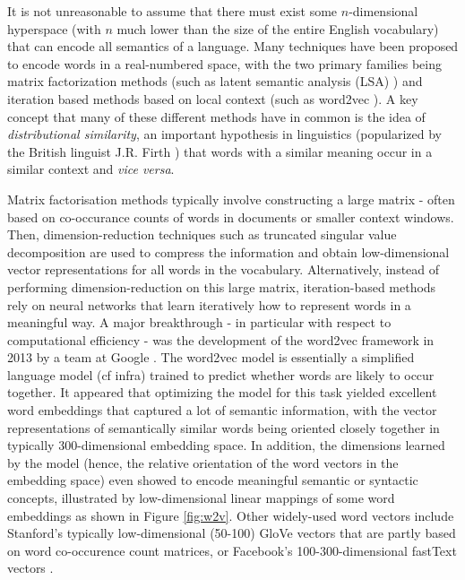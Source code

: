 \documentclass[12pt,a4paper,]{book}
\begin{document}
It is not unreasonable to assume that there must exist some \(n\)-dimensional hyperspace (with \(n\) much lower than the size of the entire English vocabulary) that can encode all semantics of a language. Many techniques have been proposed to encode words in a real-numbered space, with the two primary families being matrix factorization methods (such as latent semantic analysis (LSA) \citep{deerwester1990}) and iteration based methods based on local context (such as word2vec \citep{mikolov2013}). A key concept that many of these different methods have in common is the idea of \emph{distributional similarity}, an important hypothesis in linguistics (popularized by the British linguist J.R. Firth \citep{firth1957}) that words with a similar meaning occur in a similar context and \emph{vice versa}.

Matrix factorisation methods typically involve constructing a large matrix - often based on co-occurance counts of words in documents or smaller context windows. Then, dimension-reduction techniques such as truncated singular value decomposition are used to compress the information and obtain low-dimensional vector representations for all words in the vocabulary. Alternatively, instead of performing dimension-reduction on this large matrix, iteration-based methods rely on neural networks that learn iteratively how to represent words in a meaningful way. A major breakthrough - in particular with respect to computational efficiency - was the development of the word2vec framework in 2013 by a team at Google \citep{mikolov2013}. The word2vec model is essentially a simplified language model (cf infra) trained to predict whether words are likely to occur together. It appeared that optimizing the model for this task yielded excellent word embeddings that captured a lot of semantic information, with the vector representations of semantically similar words being oriented closely together in typically 300-dimensional embedding space. In addition, the dimensions learned by the model (hence, the relative orientation of the word vectors in the embedding space) even showed to encode meaningful semantic or syntactic concepts, illustrated by low-dimensional linear mappings of some word embeddings as shown in Figure \ref{fig:w2v}. Other widely-used word vectors include Stanford's typically low-dimensional (50-100) GloVe vectors \citep{pennington2014} that are partly based on word co-occurence count matrices, or Facebook's 100-300-dimensional fastText vectors \citep{bojanowski2017, joulin2017}.
\end{document}

